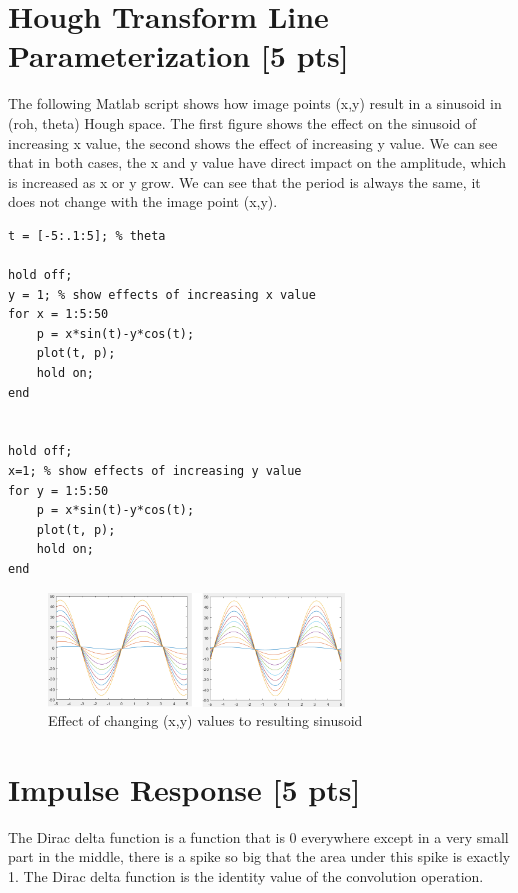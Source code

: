 \documentclass[12pt,a4paper]{article}
\begin{document}
\section{Hough Transform Line Parameterization [5 pts]}

The following Matlab script shows how image points (x,y) result in a sinusoid in (roh, theta) Hough space. The first figure shows the effect on the sinusoid of increasing x value, the second shows the effect of increasing y value.
We can see that in both cases, the x and y value have direct impact on the amplitude, which is increased as x or y grow.
We can see that the period is always the same, it does not change with the image point (x,y).

\begin{lstlisting}
t = [-5:.1:5]; % theta

hold off;
y = 1; % show effects of increasing x value
for x = 1:5:50
    p = x*sin(t)-y*cos(t);
    plot(t, p);
    hold on;
end


hold off;
x=1; % show effects of increasing y value
for y = 1:5:50
    p = x*sin(t)-y*cos(t);
    plot(t, p);
    hold on;
end
\end{lstlisting}


\begin{figure}[!h]
    \begin{center}
        \includegraphics[width=0.7\textwidth]{assets/ht.PNG}
        \caption{Effect of changing (x,y) values to resulting sinusoid}
        \label{fig:hough_transform}
    \end{center}
\end{figure}


\section{Impulse Response [5 pts]}
The Dirac delta function is a function that is 0 everywhere except in a very small part in the middle, there is a spike so big that the area under this spike is exactly 1.
The Dirac delta function is the identity value of the convolution operation.
\end{document}
